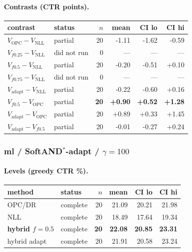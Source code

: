 \documentclass[10pt,a4paper]{article}
\begin{document}
\paragraph{Contrasts (CTR points).}
{\centering\small\begin{tabular}{llrrrr}
\toprule contrast & status & $n$ & mean & CI lo & CI hi \\
\midrule
$V_{\mathrm{OPC}}-V_{\mathrm{NLL}}$ & partial & 20 & -1.11 & -1.62 & -0.59 \\
$V_{f0.25}-V_{\mathrm{NLL}}$ & did not run & 0 & --- & --- & --- \\
$V_{f0.5}-V_{\mathrm{NLL}}$ & partial & 20 & -0.20 & -0.51 & +0.10 \\
$V_{f0.75}-V_{\mathrm{NLL}}$ & did not run & 0 & --- & --- & --- \\
$V_{\mathrm{adapt}}-V_{\mathrm{NLL}}$ & partial & 20 & -0.22 & -0.60 & +0.16 \\
\textbf{$V_{f0.5}-V_{\mathrm{OPC}}$} & partial & \textbf{20} & \textbf{+0.90} & \textbf{+0.52} & \textbf{+1.28} \\
$V_{\mathrm{adapt}}-V_{\mathrm{OPC}}$ & partial & 20 & +0.89 & +0.33 & +1.45 \\
$V_{\mathrm{adapt}}-V_{f0.5}$ & partial & 20 & -0.01 & -0.27 & +0.24 \\
\bottomrule\end{tabular}\par}
\bigskip
\subsubsection{ml / SoftAND$^*$-adapt / $\gamma=100$}
\paragraph{Levels (greedy CTR \%).}
{\centering\small\begin{tabular}{llrrrr}
\toprule method & status & $n$ & mean & CI lo & CI hi \\
\midrule
OPC/DR & complete & 20 & 21.09 & 20.21 & 21.98 \\
NLL & complete & 20 & 18.49 & 17.64 & 19.34 \\
\textbf{hybrid $f{=}0.5$} & complete & \textbf{20} & \textbf{22.08} & \textbf{20.85} & \textbf{23.31} \\
hybrid adapt & complete & 20 & 21.91 & 20.58 & 23.24 \\
\bottomrule\end{tabular}\par}
\end{document}
